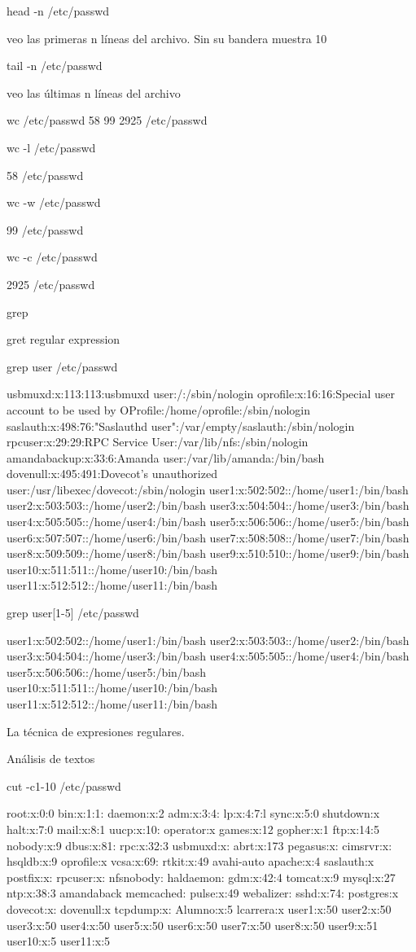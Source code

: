 \documentclass{memoir}
\begin{document}
head -n /etc/passwd

veo las primeras n líneas del archivo. Sin su bandera muestra 10

tail -n /etc/passwd

veo las últimas n líneas del archivo

wc /etc/passwd
58   99 2925 /etc/passwd

wc -l /etc/passwd

58 /etc/passwd

wc -w /etc/passwd

99 /etc/passwd

wc -c /etc/passwd

2925 /etc/passwd

grep

gret regular expression

grep user /etc/passwd

usbmuxd:x:113:113:usbmuxd user:/:/sbin/nologin
oprofile:x:16:16:Special user account to be used by OProfile:/home/oprofile:/sbin/nologin
saslauth:x:498:76:"Saslauthd user":/var/empty/saslauth:/sbin/nologin
rpcuser:x:29:29:RPC Service User:/var/lib/nfs:/sbin/nologin
amandabackup:x:33:6:Amanda user:/var/lib/amanda:/bin/bash
dovenull:x:495:491:Dovecot's unauthorized user:/usr/libexec/dovecot:/sbin/nologin
user1:x:502:502::/home/user1:/bin/bash
user2:x:503:503::/home/user2:/bin/bash
user3:x:504:504::/home/user3:/bin/bash
user4:x:505:505::/home/user4:/bin/bash
user5:x:506:506::/home/user5:/bin/bash
user6:x:507:507::/home/user6:/bin/bash
user7:x:508:508::/home/user7:/bin/bash
user8:x:509:509::/home/user8:/bin/bash
user9:x:510:510::/home/user9:/bin/bash
user10:x:511:511::/home/user10:/bin/bash
user11:x:512:512::/home/user11:/bin/bash

grep user[1-5] /etc/passwd

user1:x:502:502::/home/user1:/bin/bash
user2:x:503:503::/home/user2:/bin/bash
user3:x:504:504::/home/user3:/bin/bash
user4:x:505:505::/home/user4:/bin/bash
user5:x:506:506::/home/user5:/bin/bash
user10:x:511:511::/home/user10:/bin/bash
user11:x:512:512::/home/user11:/bin/bash

La técnica de expresiones regulares.

Análisis de textos

cut -c1-10 /etc/passwd

root:x:0:0
bin:x:1:1:
daemon:x:2
adm:x:3:4:
lp:x:4:7:l
sync:x:5:0
shutdown:x
halt:x:7:0
mail:x:8:1
uucp:x:10:
operator:x
games:x:12
gopher:x:1
ftp:x:14:5
nobody:x:9
dbus:x:81:
rpc:x:32:3
usbmuxd:x:
abrt:x:173
pegasus:x:
cimsrvr:x:
hsqldb:x:9
oprofile:x
vcsa:x:69:
rtkit:x:49
avahi-auto
apache:x:4
saslauth:x
postfix:x:
rpcuser:x:
nfsnobody:
haldaemon:
gdm:x:42:4
tomcat:x:9
mysql:x:27
ntp:x:38:3
amandaback
memcached:
pulse:x:49
webalizer:
sshd:x:74:
postgres:x
dovecot:x:
dovenull:x
tcpdump:x:
Alumno:x:5
lcarrera:x
user1:x:50
user2:x:50
user3:x:50
user4:x:50
user5:x:50
user6:x:50
user7:x:50
user8:x:50
user9:x:51
user10:x:5
user11:x:5
\end{document}
